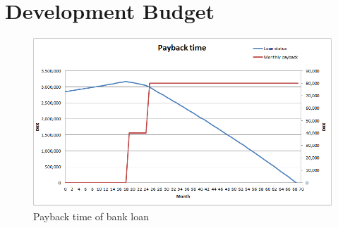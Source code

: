 \section{Development Budget}\label{development_budget}

\begin{figure}[h]
\includegraphics[width=\textwidth]{graphics/Paybacktime}
\caption{Payback time of bank loan}
\end{figure}

